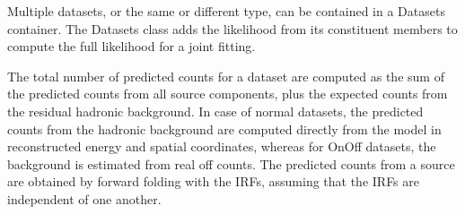 Multiple datasets, or the same or different type, can be contained in a Datasets container. The Datasets class adds the likelihood from its constituent members to compute the full likelihood for a joint fitting.

The total number of predicted counts for a dataset are computed as the sum of the predicted counts from all source components, plus the expected counts from the residual hadronic background. In case of normal datasets, the predicted counts from the hadronic background are computed directly from the model in reconstructed energy and spatial coordinates, whereas for OnOff datasets, the background is estimated from real off counts. The predicted counts from a source are obtained by forward folding with the IRFs, assuming that the IRFs are independent of one another. 
